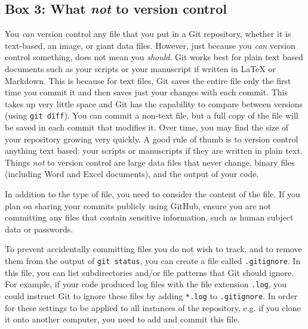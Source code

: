 \subsection{Box 3: What \textit{not} to version control}

You \textit{can} version control any file that you put in a Git repository, whether it is text-based, an image, or giant data files. However, just because you \textit{can} version control something, does not mean you \textit{should}. Git works best for plain text based documents such as your scripts or your manuscript if written in LaTeX or Markdown. This is because for text files, Git saves the entire file only the first time you commit it and then saves just your changes with each commit. This takes up very little space and Git has the capability to compare between versions (using \verb|git diff|). You can commit a non-text file, but a full copy of the file will be saved in each commit that modifies it. Over time, you may find the size of your repository growing very quickly. A good rule of thumb is to version control anything text based: your scripts or manuscripts if they are written in plain text. Things \textit{not} to version control are large data files that never change, binary files (including Word and Excel documents), and the output of your code.

In addition to the type of file, you need to consider the content of the file.
If you plan on sharing your commits publicly using GitHub, ensure you are not committing any files that contain sensitive information, such as human subject data or passwords.

To prevent accidentally committing files you do not wish to track, and to remove them from the output of \verb|git status|, you can create a file called \verb|.gitignore|.
In this file, you can list subdirectories and/or file patterns that Git should ignore.
For example, if your code produced log files with the file extension \verb|.log|, you could instruct Git to ignore these files by adding \verb|*.log| to \verb|.gitignore|.
In order for these settings to be applied to all instances of the repository, e.g. if you clone it onto another computer, you need to add and commit this file.

  
  